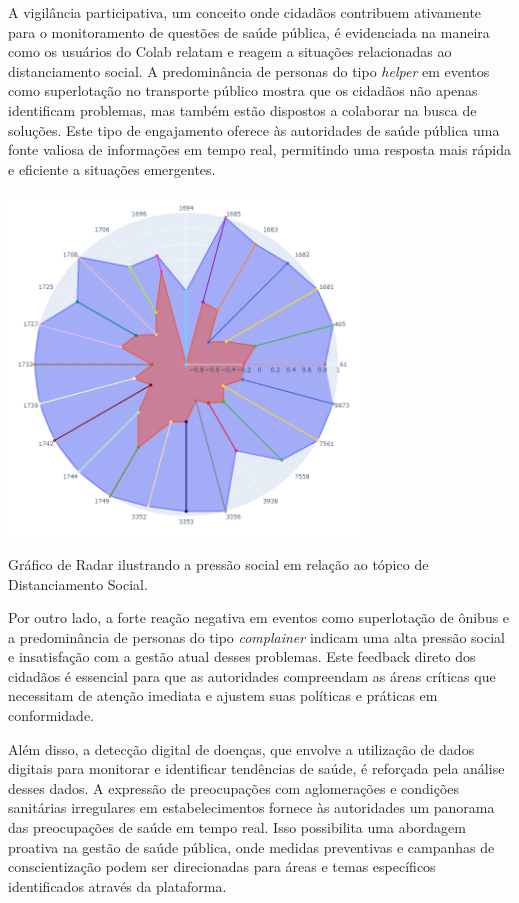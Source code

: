 A vigilância participativa, um conceito onde cidadãos contribuem ativamente para o monitoramento de questões de saúde pública, é evidenciada na maneira como os usuários do Colab relatam e reagem a situações relacionadas ao distanciamento social. A predominância de personas do tipo \textit{helper} em eventos como superlotação no transporte público mostra que os cidadãos não apenas identificam problemas, mas também estão dispostos a colaborar na busca de soluções. Este tipo de engajamento oferece às autoridades de saúde pública uma fonte valiosa de informações em tempo real, permitindo uma resposta mais rápida e eficiente a situações emergentes.

\begin{quadro}[htb]
	\centering
	\includegraphics[width=0.7\textwidth]{images/social_barometer_social_distancing.png}
	\caption{Gráfico de Radar ilustrando a pressão social em relação ao tópico de Distanciamento Social.}
	\label{fig:social_barometer_social_distancing}
\end{quadro}

Por outro lado, a forte reação negativa em eventos como superlotação de ônibus e a predominância de personas do tipo \textit{complainer} indicam uma alta pressão social e insatisfação com a gestão atual desses problemas. Este feedback direto dos cidadãos é essencial para que as autoridades compreendam as áreas críticas que necessitam de atenção imediata e ajustem suas políticas e práticas em conformidade.

Além disso, a detecção digital de doenças, que envolve a utilização de dados digitais para monitorar e identificar tendências de saúde, é reforçada pela análise desses dados. A expressão de preocupações com aglomerações e condições sanitárias irregulares em estabelecimentos fornece às autoridades um panorama das preocupações de saúde em tempo real. Isso possibilita uma abordagem proativa na gestão de saúde pública, onde medidas preventivas e campanhas de conscientização podem ser direcionadas para áreas e temas específicos identificados através da plataforma.

